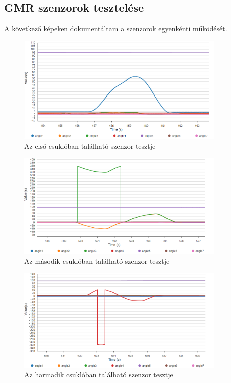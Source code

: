 \newpage
\subsection{GMR szenzorok tesztelése}

A következő képeken dokumentáltam a szenzorok egyenkénti működését.

\begin{figure}[!ht]
\centering
\includegraphics[width=100mm, keepaspectratio]{figures/Csuklo_szog_teszt/1}
\caption{Az első csuklóban található szenzor tesztje}
\label{fig:csuklo_teszt_1}
\end{figure}

\begin{figure}[!ht]
\centering
\includegraphics[width=100mm, keepaspectratio]{figures/Csuklo_szog_teszt/2_3}
\caption{Az második csuklóban található szenzor tesztje}
\label{fig:csuklo_teszt_2_3}
\end{figure}

\begin{figure}[!ht]
\centering
\includegraphics[width=100mm, keepaspectratio]{figures/Csuklo_szog_teszt/4}
\caption{Az harmadik csuklóban található szenzor tesztje}
\label{fig:csuklo_teszt_4}
\end{figure}

